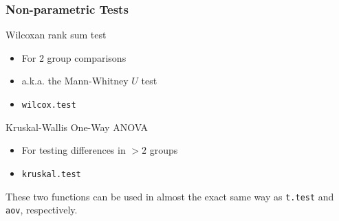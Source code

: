 \documentclass[color=usenames,dvipsnames]{beamer}\usepackage[]{graphicx}\usepackage[]{color}
\newcommand{\inr}[1]{\colorbox{inlinecolor}{\texttt{#1}}}
\begin{document}
\begin{frame}[fragile]
  \frametitle{Non-parametric Tests}
  \large
  {Wilcoxan rank sum test}
  \begin{itemize}
    \item For 2 group comparisons
    \item a.k.a. the Mann-Whitney $U$ test
    \item \inr{wilcox.test}
  \end{itemize}
  \pause
  \vspace{0.5cm}
  {Kruskal-Wallis One-Way ANOVA}
  \begin{itemize}
    \item For testing differences in $>2$ groups
    \item \inr{kruskal.test}
  \end{itemize}
\pause
\vfill
\centering
These two functions can be used in almost the exact same way as
\inr{t.test} and \inr{aov}, respectively. \\
\end{frame}







\end{document}
